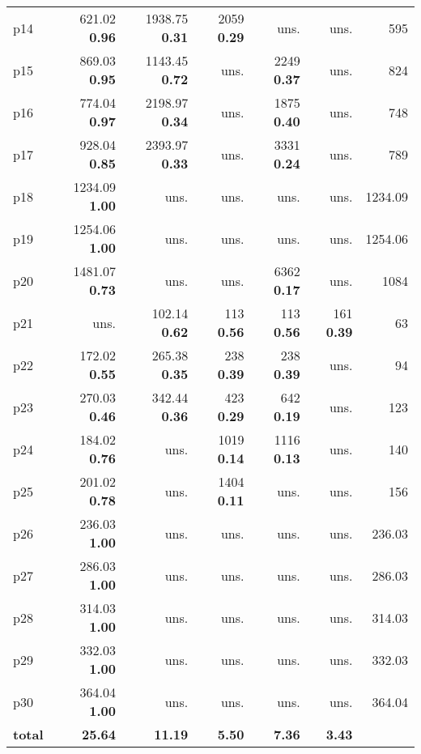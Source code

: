 \begin{tabular}{|l|rrrrr|r|}
p14 & {\footnotesize 621.02} \textbf{0.96} & {\footnotesize 1938.75} \textbf{0.31} & {\footnotesize 2059} \textbf{0.29} & uns. & uns. & 595\\
p15 & {\footnotesize 869.03} \textbf{0.95} & {\footnotesize 1143.45} \textbf{0.72} & uns. & {\footnotesize 2249} \textbf{0.37} & uns. & 824\\
p16 & {\footnotesize 774.04} \textbf{0.97} & {\footnotesize 2198.97} \textbf{0.34} & uns. & {\footnotesize 1875} \textbf{0.40} & uns. & 748\\
p17 & {\footnotesize 928.04} \textbf{0.85} & {\footnotesize 2393.97} \textbf{0.33} & uns. & {\footnotesize 3331} \textbf{0.24} & uns. & 789\\
p18 & {\footnotesize 1234.09} \textbf{1.00} & uns. & uns. & uns. & uns. & 1234.09\\
p19 & {\footnotesize 1254.06} \textbf{1.00} & uns. & uns. & uns. & uns. & 1254.06\\
p20 & {\footnotesize 1481.07} \textbf{0.73} & uns. & uns. & {\footnotesize 6362} \textbf{0.17} & uns. & 1084\\
p21 & uns. & {\footnotesize 102.14} \textbf{0.62} & {\footnotesize 113} \textbf{0.56} & {\footnotesize 113} \textbf{0.56} & {\footnotesize 161} \textbf{0.39} & 63\\
p22 & {\footnotesize 172.02} \textbf{0.55} & {\footnotesize 265.38} \textbf{0.35} & {\footnotesize 238} \textbf{0.39} & {\footnotesize 238} \textbf{0.39} & uns. & 94\\
p23 & {\footnotesize 270.03} \textbf{0.46} & {\footnotesize 342.44} \textbf{0.36} & {\footnotesize 423} \textbf{0.29} & {\footnotesize 642} \textbf{0.19} & uns. & 123\\
p24 & {\footnotesize 184.02} \textbf{0.76} & uns. & {\footnotesize 1019} \textbf{0.14} & {\footnotesize 1116} \textbf{0.13} & uns. & 140\\
p25 & {\footnotesize 201.02} \textbf{0.78} & uns. & {\footnotesize 1404} \textbf{0.11} & uns. & uns. & 156\\
p26 & {\footnotesize 236.03} \textbf{1.00} & uns. & uns. & uns. & uns. & 236.03\\
p27 & {\footnotesize 286.03} \textbf{1.00} & uns. & uns. & uns. & uns. & 286.03\\
p28 & {\footnotesize 314.03} \textbf{1.00} & uns. & uns. & uns. & uns. & 314.03\\
p29 & {\footnotesize 332.03} \textbf{1.00} & uns. & uns. & uns. & uns. & 332.03\\
p30 & {\footnotesize 364.04} \textbf{1.00} & uns. & uns. & uns. & uns. & 364.04\\
\hline
\textbf{total} & \textbf{25.64} & \textbf{11.19} & \textbf{5.50} & \textbf{7.36} & \textbf{3.43} & \\
\hline
\end{tabular}


